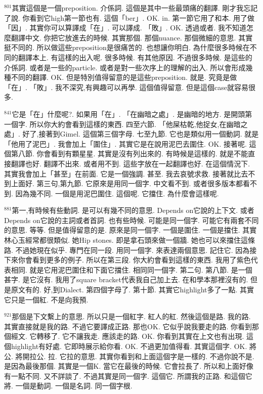 \documentclass{book}
\begin{document}
$^{801}$其實這個是一個preposition.
介係詞.
這個是其中一些最頭痛的翻譯.
剛才我忘記了說.
你看到它high第一節也有.
這個「ber」.
OK.
in.
第一節它用了和本.
用了做「因」.
其實你可以算譯成「在」.
可以譯成.
「敗」.
OK.
透過或者.
我不知道怎麼翻譯中文.
你把它放進去的時候.
其實那個.
那個nuance.
那個微細的意思.
其實挺不同的.
所以做這些preposition是很痛苦的.
也想讓你明白.
為什麼很多時候在不同的翻譯本上.
有這樣的出入呢.
很多時候.
有其他原因.
不過很多時候.
是這些的介係詞.
或者是一些的particle.
或者是對一些次序上的理解的出入.
所以會形成幾種不同的翻譯.
OK.
但是特別值得留意的是這些preposition.
就是.
究竟是做「在」.
「敗」.
我不深究,有興趣可以再學.
這個值得留意.
但是這個case就容易很多.

$^{841}$它是「在」什麼呢?.
如果用「在」.
「在幽暗之處」.
是幽暗的地方.
是開頭第一個字.
所以你大約會看到這樣的東西.
四至六節.
「他屎枯乾,他捉女,在幽暗之處」.
好了,接著到Gimel.
這個第三個字母.
七至九節.
它也是類似用一個動詞.
就是「他用了泥巴」.
我會加上「圍住」.
其實它是在說用泥巴去圍住.
OK.
接著呢.
這個第八節.
你會看到有顆星星.
其實是沒有列出來的.
有時候是這樣的.
就是不能直接翻譯也好.
翻譯不出來.
或者用不到.
這些字放在一起翻譯也好.
在這個情況下.
其實我會加上「甚至」在前面.
它是一個強調.
甚至.
我去哀號求救.
接著就比去不到上面好.
第三句,第九節.
它原來是用同一個字.
中文看不到.
或者很多版本都看不到.
因為幾不同.
一個是用泥巴圍住.
這個呢.
它擋住.
為什麼會這樣呢.

$^{881}$第一,有時候有些動詞.
是可以有幾不同的意思.
Depends on它說的上下文.
或者Depends on它說的主詞或者首詞.
也有些時候.
可能是同一個字.
可能它有兩套不同的意思.
等等.
但是值得留意的是.
原來是同一個字.
一個是圍住.
一個是擋住.
其實林心玉經常都很類似.
她Hip stones.
即是拿石頭來做一個牆.
她也可以來擋住這條路.
不過她現在似乎.
專門在同一段.
用同一個字.
來表達兩個意思.
記住它.
因為接下來你會看到更多的例子.
所以在第三段.
你大約會看到這樣的東西.
我用了紫色代表相同.
就是它用泥巴圍住和下面它擋住.
相同同一個字.
第二句.
第八節.
是一個甚字.
是它沒有.
我用了square bracket代表我自己加上去.
在和學本那裡沒有的.
但是原文有的.
好,到Dialect.
第四個字母了.
第十節.
其實它highlight多了一點.
其實它只是一個紅.
不是向我預.

$^{921}$那個是下文繫上的意思.
所以只是一個紅字.
紅人的紅.
然後這個是路.
我的路.
其實直接就是我的路.
不過它要譯成正路.
那也OK.
它似乎說我要走的路.
你看到那個經文.
它轉移了.
它不讓我走.
應該走的路.
OK.
你看到其實在上文也有出現.
這個highlight有好處.
它即時展示給你看.
OK.
不過更加值得看.
其實這個字.
OK.
將公.
將開拉公.
拉.
它拉的意思.
其實你看到和上面這個字是一樣的.
不過你說不是.
是因為最後那個.
其實是一個K.
當它在最後的時候.
它會拉長了.
所以和上面好像有一點不同.
又不詳談了.
不過其實是同一個字.
這個它.
所謂我的正路.
和這個它將.
一個是動詞.
一個是名詞.
同一個字根.
\end{document}

